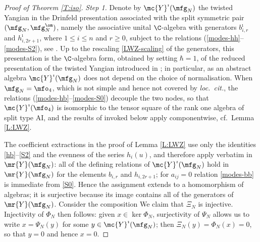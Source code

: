 \documentclass{amsart}
\numberwithin{equation}{section}
\theoremstyle{remark}
\renewcommand{\,}{\kern 0.1em} %
\begin{document}
\begin{proof}[Proof of Theorem \ref{T:iso}]
{\it Step 1.} Denote by $\mc{Y}^{\imath}(\mfg_N)$ the twisted Yangian in the Drinfeld presentation associated with the split symmetric pair $(\mfg_N,\mfg_N^{\om})$, namely the associative unital $\C$-algebra with generators $b^{\imath}_{i,r}$ and $h^{\imath}_{i,2r+1}$, where $1\le i\le n$ and $r\ge0$, subject to the relations (\ref{modes-hh}--\ref{modes-S2}), see \cite[Def.~2.7]{Lu26a}. Up to the rescaling \eqref{LWZ-scaling} of the generators, this presentation is the $\C$-algebra form, obtained by setting $\hbar=1$, of the reduced presentation \cite[Thm.~4.14]{LWZ25b} of the twisted Yangian introduced in \cite[Def.~4.1]{LWZ25b}; in particular, as an abstract algebra $\mc{Y}^{\imath}(\mfg_N)$ does not depend on the choice of normalisation. When $\mfg_N = \mfo_4$, which is not simple and hence not covered by {\it loc.~cit.}, the relations (\ref{modes-hb}--\ref{modes-S0}) decouple the two nodes, so that $\mc{Y}^{\imath}(\mfo_4)$ is isomorphic to the tensor square of the rank one algebra of split type AI, and the results of \cite{LWZ25b} invoked below apply componentwise, cf.~Lemma \ref{L:LWZ}.

The coefficient extractions in the proof of Lemma \ref{L:LWZ} use only the identities \eqref{hb}--\eqref{S2} and the evenness of the series $h_i(u)$, and therefore apply verbatim in $\mr{Y}(\mfg_N)$: all of the defining relations of $\mc{Y}^{\imath}(\mfg_N)$ hold in $\mr{Y}(\mfg_N)$ for the elements $b_{i,r}$ and $h_{i,2r+1}$; for $a_{ij}=0$ relation \eqref{modes-bb} is immediate from \eqref{S0}. Hence the assignment
%
%
extends to a homomorphism of algebras; it is surjective because its image contains all of the generators of $\mr{Y}(\mfg_N)$. Consider the composition
%
%
We claim that $\Xi_N$ is injective. Injectivity of $\Phi_N$ then follows: given $x \in \ker \Phi_N$, surjectivity of $\Psi_N$ allows us to write $x = \Psi_N(y)$ for some $y \in \mc{Y}^{\imath}(\mfg_N)$; then $\Xi_N(y) = \Phi_N(x) = 0$, so that $y = 0$ and hence $x = 0$.

\smallskip


\end{proof}
\end{document}
